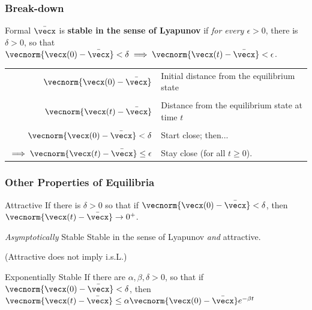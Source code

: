 \documentclass[12pt]{beamer}
\begin{document}
\begin{frame}
\frametitle{Break-down}

\begin{block}{Formal}
$\bar\vecx$ is \textbf{stable in the sense of Lyapunov} if
\emph{for every $\epsilon > 0$}, there is $\delta >0$, so that
$\vecnorm{\vecx(0)-\bar\vecx} < \delta
 \implies \vecnorm{\vecx(t) - \bar\vecx} < \epsilon$. 
\end{block}

\begin{tabular}{rp{.6\linewidth}}
$\vecnorm{\vecx(0)-\bar\vecx}$
	& Initial distance from the equilibrium state \\ \\
	
$\vecnorm{\vecx(t)-\bar\vecx}$
	& Distance from the equilibrium state at time $t$ \\ \\
	
$\vecnorm{\vecx(0)-\bar\vecx} < \delta$
	& Start close; then... \\ \\

$\implies \vecnorm{\vecx(t)-\bar\vecx} \leq \epsilon$
	& Stay close (for all $t \geq 0$). \\

\end{tabular}

\vfill\null

\end{frame}





\begin{frame}
\frametitle{Other Properties of Equilibria}

\begin{block}{Attractive}
If there is $\delta > 0$ so that if $\vecnorm{\vecx(0)-\bar\vecx} < \delta$, then
$\vecnorm{\vecx(t)-\bar{\vecx}} \to 0^+$.
\end{block}

\begin{block}{\emph{Asymptotically} Stable}
Stable in the sense of Lyapunov \emph{and} attractive.

(Attractive does not imply i.s.L.)
\end{block}

\begin{block}{Exponentially Stable}
If there are $\alpha, \beta, \delta >0$, so that if
$\vecnorm{\vecx(0)-\bar{\vecx}} < \delta$, then
$\vecnorm{\vecx(t)-\bar\vecx}
	\leq \alpha \vecnorm{\vecx(0)-\bar\vecx} e^{-\beta t}$
\end{block}

\end{frame}
\end{document}
